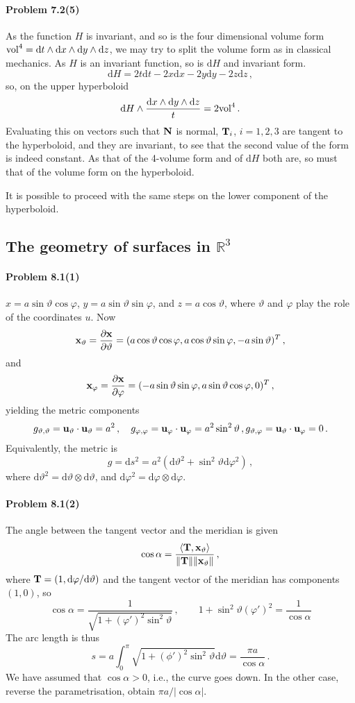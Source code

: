\documentclass[a4paper,12pt]{article}
\def\d{\mathrm{d}}
\newcommand{\problem}[1]{\paragraph{Problem #1}}
\begin{document}

\problem{7.2(5)} As the function $H$ is invariant, and so is the four dimensional volume form ${\rm vol}^4=\d t \wedge \d x \wedge \d y \wedge \d z$, we may try to split the volume form as in classical mechanics. As $H$ is an invariant function, so is $\d H$ and invariant form.
\[
 \d H = 2 t\d t - 2 x\d x - 2 y \d y - 2z \d z\,,
\]
so, on the upper hyperboloid
\[
 \d H \wedge \frac{\d x\wedge \d y\wedge \d z}{t} = 2{\rm vol}^4\,.
\]
Evaluating this on vectors such that ${\bf N}$ is normal, ${\bf T}_i$, $i=1,2,3$ are tangent to the hyperboloid, and they are invariant, to see that the second value of the form is indeed constant. As that of the 4-volume form and of $\d H$ both are, so must that of the volume form on the hyperboloid.

It is possible to proceed with the same steps on the lower component of the hyperboloid.


\subsection{The geometry of surfaces in \texorpdfstring{$\mathbb{R}^3$}{R3}}

\problem{8.1(1)} $x=a\sin\vartheta\cos\varphi$, $y=a\sin\vartheta\sin\varphi$, and $z=a\cos\vartheta$, where $\vartheta$ and $\varphi$ play the role of the coordinates $u$. Now
\[
 {\bf x}_\vartheta=\frac{\partial\bf x}{\partial\vartheta} = (a\cos\vartheta\cos\varphi, a\cos\vartheta\sin\varphi,-a\sin\vartheta)^T\,,
\]
and
\[
 {\bf x}_\varphi=\frac{\partial\bf x}{\partial\varphi} = (-a\sin\vartheta\sin\varphi, a\sin\vartheta\cos\varphi,0)^T\,,
\]
yielding the metric components
\[
 g_{\vartheta,\vartheta}={\bf u}_\vartheta\cdot{\bf u}_\vartheta = a^2\,,\quad g_{\varphi,\varphi}={\bf u}_\varphi\cdot{\bf u}_\varphi = a^2\sin^2\vartheta\,,g_{\vartheta,\varphi}={\bf u}_\vartheta\cdot{\bf u}_\varphi = 0\,.
\]
Equivalently, the metric is
\[
 g = \d s^2 = a^2(\d\vartheta^2 + \sin^2\vartheta\d\varphi^2)\,,
\]
where $\d\vartheta^2=\d\vartheta\otimes \d\vartheta$, and $\d\varphi^2=\d\varphi\otimes \d\varphi$.


\problem{8.1(2)} The angle between the tangent vector and the meridian is given
\[
 \cos\alpha = \frac{\langle {\bf T},{\bf x}_\vartheta\rangle}{\|{\bf T}\| \|{\bf x}_\vartheta\|}\,,
\]
where ${\bf T}=(1,\d\varphi/\d\vartheta)$ and the tangent vector of the meridian has components $(1,0)$, so
\[
 \cos\alpha = \frac{1}{\sqrt{1+(\varphi')^2\sin^2\vartheta}}\,,\quad\quad
 1+\sin^2\vartheta (\varphi')^2 = \frac{1}{\cos\alpha}
\]
The arc length is thus 
\[
 s=a\int_0^\pi \sqrt{1+(\phi')^2\sin^2\vartheta}\d\vartheta=\frac{\pi a}{\cos\alpha}\,.
\]
We have assumed that $\cos\alpha >0$, i.e., the curve goes down. In the other case, reverse the parametrisation, obtain $\pi a/|\cos\alpha|$.
\end{document}
